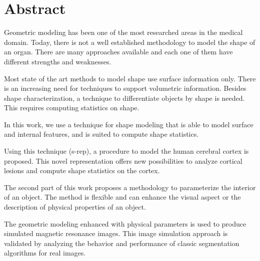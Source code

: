 \cleardoublepage

\section*{\huge Abstract}

Geometric modeling has been one of the most researched areas 
in the medical domain.
Today, there is not a well established methodology to model the shape of an organ. 
There are many approaches available and each one of them have different strengths and weaknesses.

Most state of the art methods to model shape use surface information only.
There is an increasing need for techniques to support volumetric information.
Besides shape characterization, a technique to differentiate objects by shape is needed.
This requires computing statistics on shape.


In this work, we use a technique for shape modeling that is
able to model surface and internal features, and 
is suited to compute shape statistics.

Using this technique (s-rep), a procedure to model the human cerebral cortex is proposed. 
This novel representation offers new possibilities to analyze cortical lesions
and compute shape statistics on the cortex.

The second part of this work proposes a methodology to 
parameterize the interior of an object.
The method is flexible and can 
enhance the visual aspect or the description of physical properties of an object.

The geometric modeling enhanced with physical parameters is used 
to produce simulated magnetic resonance images.
This image simulation approach is validated by analyzing the behavior and performance of classic segmentation algorithms for real images.
